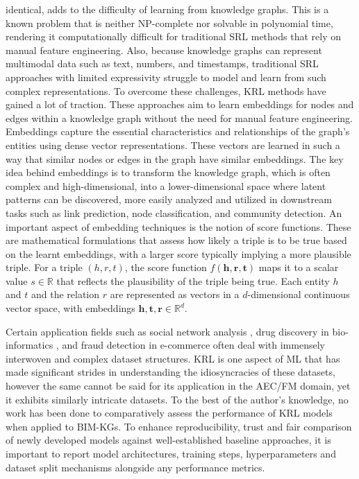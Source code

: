 identical, adds to the difficulty of learning from knowledge graphs. This is a known problem that is neither NP-complete nor solvable in polynomial time, rendering it computationally difficult for traditional \ac{SRL} methods that rely on manual feature engineering. Also, because knowledge graphs can represent multimodal data such as text, numbers, and timestamps, traditional \ac{SRL} approaches with limited expressivity struggle to model and learn from such complex representations. To overcome these challenges, \acf{KRL} methods have gained a lot of traction. These approaches aim to learn embeddings for nodes and edges within a knowledge graph without the need for manual feature engineering. Embeddings capture the essential characteristics and relationships of the graph's entities using dense vector representations. These vectors are learned in such a way that similar nodes or edges in the graph have similar embeddings. The key idea behind embeddings is to transform the knowledge graph, which is often complex and high-dimensional, into a lower-dimensional space where latent patterns can be discovered, more easily analyzed and utilized in downstream tasks such as link prediction, node classification, and community detection. An important aspect of embedding techniques is the notion of score functions. These are mathematical formulations that assess how likely a triple is to be true based on the learnt embeddings, with a larger score typically implying a more plausible triple.  For a triple \((h, r, t)\), the score function \(f(\mathbf{h}, \mathbf{r}, \mathbf{t}) \) maps it to a scalar value \(s \in \mathbb{R}\) that reflects the plausibility of the triple being true. Each entity \(h\) and \(t\) and the relation \(r\) are represented as vectors in a \(d\)-dimensional continuous vector space, with embeddings \(\mathbf{h}, \mathbf{t}, \mathbf{r} \in \mathbb{R}^d\).

Certain application fields such as social network analysis \citep{Xu2021UnderstandingApplications}, drug discovery in bio-informatics \citep{MacLean2021KnowledgeDiscovery}, and fraud detection in e-commerce \citep{Shen2021FinancialDetection} often deal with immensely interwoven and complex dataset structures. \ac{KRL} is one aspect of \ac{ML} that has made significant strides in understanding the idiosyncracies of these datasets, however the same cannot be said for its application in the \ac{AEC/FM} domain, yet it exhibits similarly intricate datasets. To the best of the author's knowledge, no work has been done to comparatively assess the performance of \ac{KRL} models when applied to \acp{BIM-KG}. To enhance reproducibility, trust and fair comparison of newly developed models against well-established baseline approaches, it is important to report model architectures, training steps, hyperparameters and dataset split mechanisms alongside any performance metrics. 

